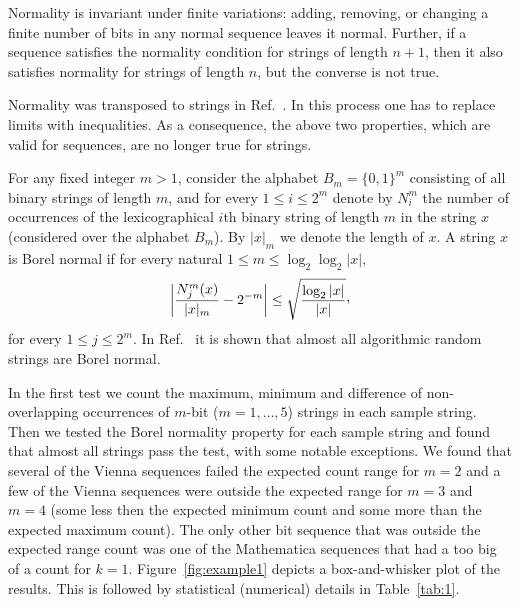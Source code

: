 \documentclass[10pt]{article}%
\begin{document}
Normality is invariant under finite variations: adding, removing, or changing a finite number of bits in any normal sequence leaves it normal. Further, if a sequence satisfies the normality condition
for strings of length $n+1$, then it also satisfies normality for strings of length $n$, but the converse is not true.

Normality was transposed to  strings in Ref.~\cite{DBLP:conf/dlt/Calude93}. In this process one  has to replace limits with inequalities. As a consequence, the above two properties, which are valid for sequences, are no longer true for strings.



For any fixed  integer $m > 1$, consider the alphabet $B_{m} = \{0,1\}^{m}$ consisting of all binary strings of length $m$,
 and for
every $1 \leq i \leq 2^{m}$ denote by $N_{i}^{m}$ the
 number of occurrences of the lexicographical $i$th binary string of length $m$ in the string $x$ (considered over the alphabet $B_{m}$).
 By $|x|_{m}$ we denote the length of $x$.
 A string $x$ is Borel normal if
  for every natural $1 \leq m \leq \log_{2}\log_{2} |x|,$
  \[
\left| \frac{N_{j}^{m}(x)}{|x|_{m}} -  2^{-m} \right| \leq
\sqrt\frac{\log_{2}|x|}{|x|}\raisebox{0.5ex}{,}\]
for every $1 \leq j \leq 2^{m}$.
In Ref.~\cite{DBLP:conf/dlt/Calude93}
it is shown that almost all algorithmic random strings are Borel normal.


In the first test
we  count the maximum, minimum and difference of non-overlapping occurrences of  $m$-bit ($m=1,\ldots , 5$) strings  in
each sample string.   Then we tested the Borel normality property for each sample string and found that
almost all strings pass the  test,  with some notable exceptions.
We found that several of the Vienna sequences failed the expected count range for
$m=2$ and a few of the Vienna sequences were outside the expected range for $m=3$
and $m=4$ (some less then the expected minimum count and some more than the expected
maximum count).  The only other bit sequence that was outside the expected range
count was one of the Mathematica sequences that had a too big of a count for $k=1$.
%
Figure~\ref{fig:example1} depicts a box-and-whisker plot of the
results. This is followed by statistical (numerical) details
in Table~\ref{tab:1}.
\end{document}
